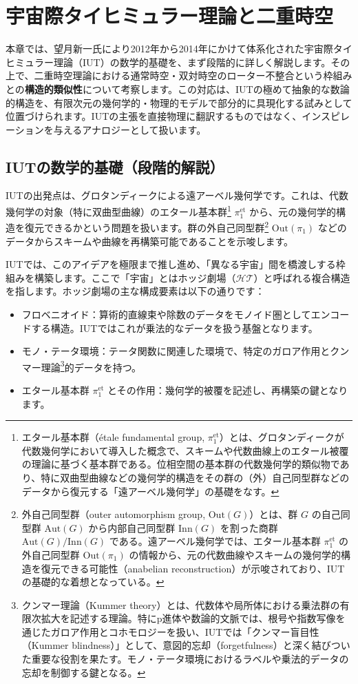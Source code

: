 \documentclass[a4paper,12pt,notitlepage]{jsreport}
\begin{document}
\chapter{宇宙際タイヒミュラー理論と二重時空}

本章では、望月新一氏により2012年から2014年にかけて体系化された宇宙際タイヒミュラー理論（IUT）の数学的基礎を、まず段階的に詳しく解説します。その上で、二重時空理論における通常時空・双対時空のローター不整合という枠組みとの\textbf{構造的類似性}について考察します。この対応は、IUTの極めて抽象的な数論的構造を、有限次元の幾何学的・物理的モデルで部分的に具現化する試みとして位置づけられます。IUTの主張を直接物理に翻訳するものではなく、インスピレーションを与えるアナロジーとして扱います。

\section{IUTの数学的基礎（段階的解説）}

IUTの出発点は、グロタンディークによる遠アーベル幾何学です。これは、代数幾何学の対象（特に双曲型曲線）のエタール基本群\footnote{エタール基本群（étale fundamental group, $\pi_1^{\mathrm{et}}$）とは、グロタンディークが代数幾何学において導入した概念で、スキームや代数曲線上のエタール被覆の理論に基づく基本群である。位相空間の基本群の代数幾何学的類似物であり、特に双曲型曲線などの幾何学的構造をその群の（外）自己同型群などのデータから復元する「遠アーベル幾何学」の基礎をなす。} $\pi_1^{\mathrm{et}}$ から、元の幾何学的構造を復元できるかという問題を扱います。群の外自己同型群\footnote{外自己同型群（outer automorphism group, $\mathrm{Out}(G)$）とは、群 $G$ の自己同型群 $\mathrm{Aut}(G)$ から内部自己同型群 $\mathrm{Inn}(G)$ を割った商群 $\mathrm{Aut}(G)/\mathrm{Inn}(G)$ である。遠アーベル幾何学では、エタール基本群 $\pi_1^{\mathrm{et}}$ の外自己同型群 $\mathrm{Out}(\pi_1)$ の情報から、元の代数曲線やスキームの幾何学的構造を復元できる可能性（anabelian reconstruction）が示唆されており、IUTの基礎的な着想となっている。} $\mathrm{Out}(\pi_1)$ などのデータからスキームや曲線を再構築可能であることを示唆します。

IUTでは、このアイデアを極限まで推し進め、「異なる宇宙」間を橋渡しする枠組みを構築します。ここで「宇宙」とはホッジ劇場（$\mathcal{HT}$）と呼ばれる複合構造を指します。ホッジ劇場の主な構成要素は以下の通りです：

\begin{itemize}
  \item フロベニオイド：算術的直線束や除数のデータをモノイド圏としてエンコードする構造。IUTではこれが乗法的なデータを扱う基盤となります。
  \item モノ・テータ環境：テータ関数に関連した環境で、特定のガロア作用とクンマー理論\footnote{クンマー理論（Kummer theory）とは、代数体や局所体における乗法群の有限次拡大を記述する理論。特にp進体や数論的文脈では、根号や指数写像を通じたガロア作用とコホモロジーを扱い、IUTでは「クンマー盲目性（Kummer blindness）」として、意図的忘却（forgetfulness）と深く結びついた重要な役割を果たす。モノ・テータ環境におけるラベルや乗法的データの忘却を制御する鍵となる。}的データを持つ。
  \item エタール基本群 $\pi_1^{\mathrm{et}}$ とその作用：幾何学的被覆を記述し、再構築の鍵となります。
\end{itemize}
\end{document}
